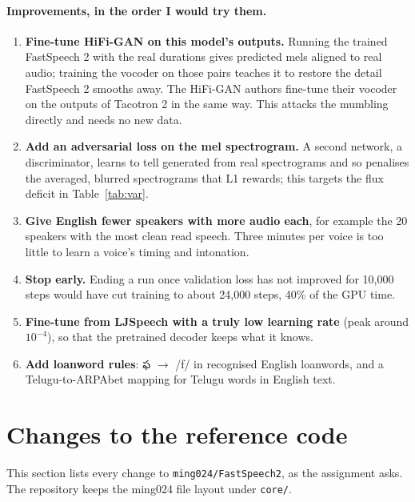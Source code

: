 \documentclass[11pt,a4paper]{article}
\newcommand{\tel}[1]{{\te #1}}
\newcommand{\code}[1]{\texttt{#1}}
\begin{document}
\paragraph{Improvements, in the order I would try them.}
\begin{enumerate}
\item \textbf{Fine-tune HiFi-GAN on this model's outputs.} Running the trained FastSpeech 2 with the real durations
gives predicted mels aligned to real audio; training the vocoder on those pairs teaches it to restore the detail
FastSpeech 2 smooths away. The HiFi-GAN authors fine-tune their vocoder on the outputs of Tacotron 2 in the
same way. This attacks
the mumbling directly and needs no new data.
\item \textbf{Add an adversarial loss on the mel spectrogram.} A second network, a discriminator, learns to tell generated from real spectrograms and so penalises the
averaged, blurred spectrograms that L1 rewards; this targets the flux deficit in Table~\ref{tab:var}.
\item \textbf{Give English fewer speakers with more audio each}, for example the 20 speakers with the most clean
read speech. Three minutes per voice is too little to learn a voice's timing and intonation.
\item \textbf{Stop early.} Ending a run once validation loss has not improved for 10,000 steps would have cut
training to about 24,000 steps, 40\% of the GPU time.
\item \textbf{Fine-tune from LJSpeech with a truly low learning rate} (peak around $10^{-4}$), so that the
pretrained decoder keeps what it knows.
\item \textbf{Add loanword rules}: \tel{ఫ} $\to$ /f/ in recognised English loanwords, and a Telugu-to-ARPAbet
mapping for Telugu words in English text.
\end{enumerate}

\section{Changes to the reference code}
\label{sec:changes}
This section lists every change to \code{ming024/FastSpeech2}, as the assignment asks. The repository keeps the
ming024 file layout under \code{core/}.
\end{document}
